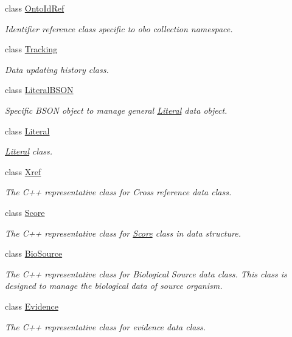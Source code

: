 \begin{DoxyCompactItemize}
class \hyperlink{classunisys_1_1OntoIdRef}{Onto\-Id\-Ref}
\begin{DoxyCompactList}\small\item\em Identifier reference class specific to obo collection namespace. \end{DoxyCompactList}\item 
class \hyperlink{classunisys_1_1Tracking}{Tracking}
\begin{DoxyCompactList}\small\item\em Data updating history class. \end{DoxyCompactList}\item 
class \hyperlink{classunisys_1_1LiteralBSON}{Literal\-B\-S\-O\-N}
\begin{DoxyCompactList}\small\item\em Specific B\-S\-O\-N object to manage general \hyperlink{classunisys_1_1Literal}{Literal} data object. \end{DoxyCompactList}\item 
class \hyperlink{classunisys_1_1Literal}{Literal}
\begin{DoxyCompactList}\small\item\em \hyperlink{classunisys_1_1Literal}{Literal} class. \end{DoxyCompactList}\item 
class \hyperlink{classunisys_1_1Xref}{Xref}
\begin{DoxyCompactList}\small\item\em The C++ representative class for Cross reference data class. \end{DoxyCompactList}\item 
class \hyperlink{classunisys_1_1Score}{Score}
\begin{DoxyCompactList}\small\item\em The C++ representative class for \hyperlink{classunisys_1_1Score}{Score} class in data structure. \end{DoxyCompactList}\item 
class \hyperlink{classunisys_1_1BioSource}{Bio\-Source}
\begin{DoxyCompactList}\small\item\em The C++ representative class for Biological Source data class. This class is designed to manage the biological data of source organism. \end{DoxyCompactList}\item 
class \hyperlink{classunisys_1_1Evidence}{Evidence}
\begin{DoxyCompactList}\small\item\em The C++ representative class for evidence data class. \end{DoxyCompactList}\item 

\end{DoxyCompactItemize}
